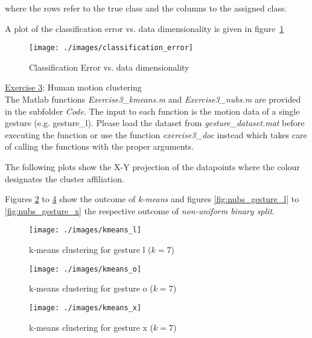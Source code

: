 where the rows refer to the true class and the columns to the assigned class.

A plot of the classification error vs. data dimensionality is given in figure~\ref{fig:classification_error_over_d}

\begin{figure}[hbtp]
  \centering
  \texttt{[image: ./images/classification\_error]}
  \caption{Classification Error vs. data dimensionality}
  \label{fig:classification_error_over_d}
\end{figure}

\FloatBarrier
\newpage

\ul{Exercise 3}: Human motion clustering \\[3mm]

The Matlab functions \textit{Exercise3\_kmeans.m} and
\textit{Exercise3\_nubs.m} are provided in the subfolder
\textit{Code}. The input to each function is
the motion data of a single gesture (e.g. gesture\_l). Please load the
dataset from \textit{gesture\_dataset.mat} before executing
the function or use the function \emph{exercise3\_doc} instead which takes care of calling the functions with the proper arguments.

The following plots show the X-Y projection of the datapoints where the colour designates the cluster affiliation.

Figures \ref{fig:k_means_gesture_l} to \ref{fig:k_means_gesture_x} show
the outcome of \emph{k-means} and figures
\ref{fig:nubs_gesture_l} to \ref{fig:nubs_gesture_x} the respective outcome of \emph{non-uniform binary split}.

\begin{figure}[h]
  \centering
  \texttt{[image: ./images/kmeans\_l]}
  \caption{k-means clustering for gesture l ($k=7$)}
  \label{fig:k_means_gesture_l}
\end{figure}
\begin{figure}[h]
  \centering
  \texttt{[image: ./images/kmeans\_o]}
  \caption{k-means clustering for gesture o ($k=7$)}
  \label{fig:k_means_gesture_o}
\end{figure}
\begin{figure}[h]
  \centering
  \texttt{[image: ./images/kmeans\_x]}
  \caption{k-means clustering for gesture x ($k=7$)}
  \label{fig:k_means_gesture_x}
\end{figure}


